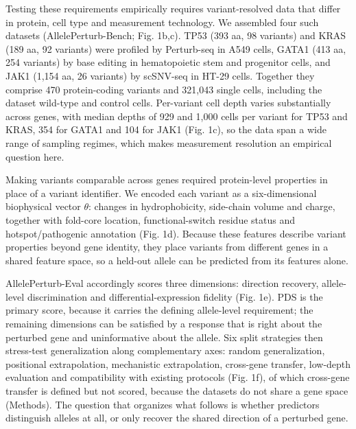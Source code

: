 \documentclass[11pt,letterpaper]{article}
\begin{document}
Testing these requirements empirically requires variant-resolved data that differ in protein, cell type and measurement technology. We assembled four such datasets (AllelePerturb-Bench; Fig. 1b,c). TP53 (393 aa, 98 variants) and KRAS (189 aa, 92 variants) were profiled by Perturb-seq in A549 cells\cite{Ursu2022}, GATA1 (413 aa, 254 variants) by base editing in hematopoietic stem and progenitor cells\cite{PerturbNet}, and JAK1 (1,154 aa, 26 variants) by scSNV-seq in HT-29 cells\cite{Cooper2024}. Together they comprise 470 protein-coding variants and 321,043 single cells, including the dataset wild-type and control cells. Per-variant cell depth varies substantially across genes, with median depths of 929 and 1,000 cells per variant for TP53 and KRAS, 354 for GATA1 and 104 for JAK1 (Fig. 1c), so the data span a wide range of sampling regimes, which makes measurement resolution an empirical question here.

Making variants comparable across genes required protein-level properties in place of a variant identifier. We encoded each variant as a six-dimensional biophysical vector $\theta$: changes in hydrophobicity, side-chain volume and charge, together with fold-core location, functional-switch residue status and hotspot/pathogenic annotation (Fig. 1d). Because these features describe variant properties beyond gene identity, they place variants from different genes in a shared feature space, so a held-out allele can be predicted from its features alone.

AllelePerturb-Eval accordingly scores three dimensions: direction recovery, allele-level discrimination and differential-expression fidelity (Fig. 1e). PDS is the primary score, because it carries the defining allele-level requirement; the remaining dimensions can be satisfied by a response that is right about the perturbed gene and uninformative about the allele. Six split strategies then stress-test generalization along complementary axes: random generalization, positional extrapolation, mechanistic extrapolation, cross-gene transfer, low-depth evaluation and compatibility with existing protocols (Fig. 1f), of which cross-gene transfer is defined but not scored, because the datasets do not share a gene space (Methods). The question that organizes what follows is whether predictors distinguish alleles at all, or only recover the shared direction of a perturbed gene.
\end{document}
